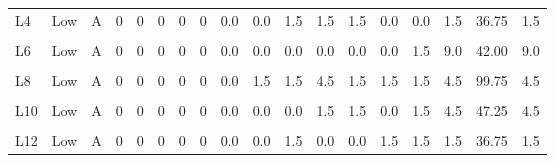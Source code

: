 \documentclass[12pt,final,CPage]{ufthesis}
\begin{document}
{\begin{table}
{\begin{tabular}[t]{lllrrrrrrrrrrrrrrr}
  L4 & Low & A & 0 & 0 & 0 & 0 & 0 & 0.0 & 0.0 & 1.5 & 1.5 & 1.5 & 0.0 & 0.0 & 1.5 & 36.75 & 1.5\\
  \cellcolor{gray!6}{L5} & \cellcolor{gray!6}{Low} & \cellcolor{gray!6}{S} & \cellcolor{gray!6}{0} & \cellcolor{gray!6}{0} & \cellcolor{gray!6}{0} & \cellcolor{gray!6}{0} & \cellcolor{gray!6}{0} & \cellcolor{gray!6}{0.0} & \cellcolor{gray!6}{0.0} & \cellcolor{gray!6}{1.5} & \cellcolor{gray!6}{0.0} & \cellcolor{gray!6}{1.5} & \cellcolor{gray!6}{0.0} & \cellcolor{gray!6}{0.0} & \cellcolor{gray!6}{17.5} & \cellcolor{gray!6}{82.25} & \cellcolor{gray!6}{17.5}\\
  L6 & Low & A & 0 & 0 & 0 & 0 & 0 & 0.0 & 0.0 & 0.0 & 0.0 & 0.0 & 0.0 & 1.5 & 9.0 & 42.00 & 9.0\\
  \cellcolor{gray!6}{L7} & \cellcolor{gray!6}{Low} & \cellcolor{gray!6}{S} & \cellcolor{gray!6}{0} & \cellcolor{gray!6}{0} & \cellcolor{gray!6}{0} & \cellcolor{gray!6}{0} & \cellcolor{gray!6}{0} & \cellcolor{gray!6}{1.5} & \cellcolor{gray!6}{1.5} & \cellcolor{gray!6}{1.5} & \cellcolor{gray!6}{0.0} & \cellcolor{gray!6}{0.0} & \cellcolor{gray!6}{1.5} & \cellcolor{gray!6}{1.5} & \cellcolor{gray!6}{17.5} & \cellcolor{gray!6}{113.75} & \cellcolor{gray!6}{17.5}\\
  L8 & Low & A & 0 & 0 & 0 & 0 & 0 & 0.0 & 1.5 & 1.5 & 4.5 & 1.5 & 1.5 & 1.5 & 4.5 & 99.75 & 4.5\\
  \addlinespace
  \cellcolor{gray!6}{L9} & \cellcolor{gray!6}{Low} & \cellcolor{gray!6}{S} & \cellcolor{gray!6}{0} & \cellcolor{gray!6}{0} & \cellcolor{gray!6}{0} & \cellcolor{gray!6}{0} & \cellcolor{gray!6}{0} & \cellcolor{gray!6}{0.0} & \cellcolor{gray!6}{0.0} & \cellcolor{gray!6}{0.0} & \cellcolor{gray!6}{1.5} & \cellcolor{gray!6}{0.0} & \cellcolor{gray!6}{0.0} & \cellcolor{gray!6}{0.0} & \cellcolor{gray!6}{17.5} & \cellcolor{gray!6}{71.75} & \cellcolor{gray!6}{17.5}\\
  L10 & Low & A & 0 & 0 & 0 & 0 & 0 & 0.0 & 0.0 & 0.0 & 1.5 & 1.5 & 0.0 & 1.5 & 4.5 & 47.25 & 4.5\\
  \cellcolor{gray!6}{L11} & \cellcolor{gray!6}{Low} & \cellcolor{gray!6}{A} & \cellcolor{gray!6}{0} & \cellcolor{gray!6}{0} & \cellcolor{gray!6}{0} & \cellcolor{gray!6}{0} & \cellcolor{gray!6}{0} & \cellcolor{gray!6}{0.0} & \cellcolor{gray!6}{0.0} & \cellcolor{gray!6}{0.0} & \cellcolor{gray!6}{0.0} & \cellcolor{gray!6}{1.5} & \cellcolor{gray!6}{4.5} & \cellcolor{gray!6}{1.5} & \cellcolor{gray!6}{0.0} & \cellcolor{gray!6}{52.50} & \cellcolor{gray!6}{0.0}\\
  L12 & Low & A & 0 & 0 & 0 & 0 & 0 & 0.0 & 0.0 & 1.5 & 0.0 & 0.0 & 1.5 & 1.5 & 1.5 & 36.75 & 1.5\\

\end{tabular}}
\end{table}}
\end{document}
